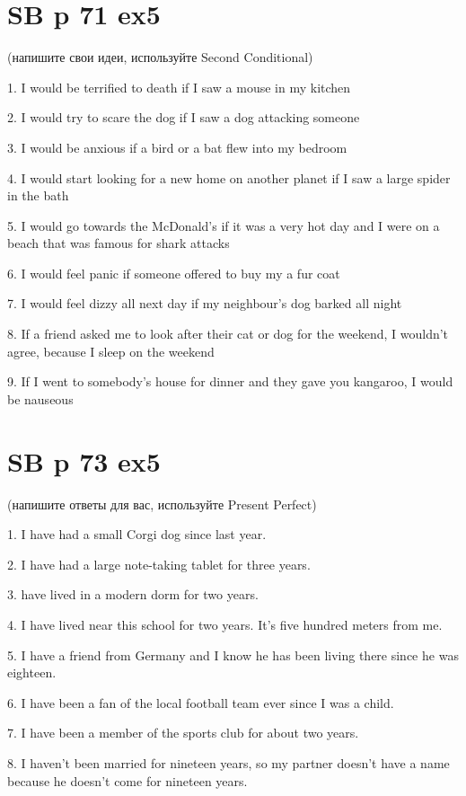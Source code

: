 \documentclass{article}
\begin{document}
\section{SB p 71 ex5  }
(напишите свои идеи, используйте Second Conditional)

1. I would be terrified to death if I saw a mouse in my kitchen

2. I would try to scare the dog if I saw a dog attacking someone

3. I would be anxious if a bird or a bat flew into my bedroom

4. I would start looking for a new home on another planet if I saw a large spider in the bath

5. I would go towards the McDonald's if it was a very hot day and I were on a beach that was famous for shark attacks

6. I would feel panic if someone offered to buy my a fur coat

7. I would feel dizzy all next day if my neighbour's dog barked all night

8. If a friend asked me to look after their cat or dog for the weekend, I wouldn't agree, because I sleep on the weekend

9. If I went to somebody's house for dinner and they gave you kangaroo, I would be nauseous
\section{SB p 73 ex5}
(напишите ответы для вас, используйте Present Perfect)

1. I have had a small Corgi dog since last year.

2. I have had a large note-taking tablet for three years.

3.  have lived in a modern dorm for two years.

4. I have lived near this school for two years. It's five hundred meters from me.

5. I have a friend from Germany and I know he has been living there since he was eighteen.

6. I have been a fan of the local football team ever since I was a child.

7. I have been a member of the sports club for about two years.

8. I haven't been married for nineteen years, so my partner doesn't have a name because he doesn't come for nineteen years.
\end{document}

